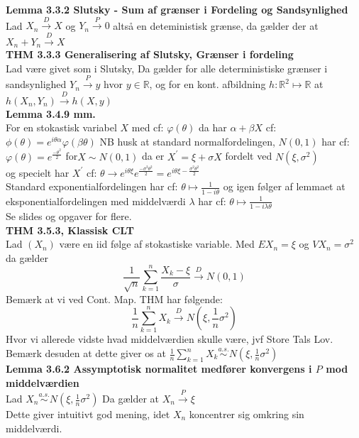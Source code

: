 \textbf{Lemma 3.3.2 Slutsky - Sum af grænser i Fordeling og Sandsynlighed}\\
Lad $X_n \xrightarrow{D} X$ og $Y_n \xrightarrow{P} 0$ altså en deteministisk grænse, da gælder der at $X_n + Y_n \xrightarrow{D} X$ \\
\textbf{THM 3.3.3 Generalisering af Slutsky, Grænser i fordeling}\\
Lad være givet som i Slutsky, Da gælder for alle deterministiske grænser i sandsynlighed $Y_n \xrightarrow{P} y$ hvor $y \in \mathbb{R}$, og for en kont. afbildning $h:\mathbb{R}^2 \mapsto \mathbb{R}$ at $h(X_n, Y_n) \xrightarrow{D} h(X,y)$\newline \\

\textbf{Lemma 3.4.9  mm.}\\
For en stokastisk variabel $X$ med cf: $\varphi(\theta)$ da har $\alpha + \beta X$ cf: $\phi (\theta )=e^{i\theta \alpha}  \varphi (\beta \theta )$\newline
NB husk at standard normalfordelingen, $N(0,1)$ har cf: $\varphi(\theta)= e^{\frac{-\theta^2}{2}}$
for\newline $X\sim N(0,1)$ da er $X^\prime = \xi + \sigma X$ fordelt ved $N(\xi , \sigma ^2)$\\ og specielt har $X^\prime$ cf:
$\theta \to e^{i\theta \xi} e^{\frac{-\sigma ^2 \theta ^2}{2}}=e^{i\theta \xi -\frac{\sigma ^2 \theta ^2}{2}}$ \\
Standard exponentialfordelingen har cf:  $\theta \mapsto \frac{1}{1-i\theta}$ og igen følger af lemmaet at eksponentialfordelingen med middelværdi $\lambda$ har cf: $\theta \mapsto \frac{1}{1-i\lambda \theta}$\\
Se slides og opgaver for flere.\newline
\\
\textbf{THM 3.5.3, Klassisk CLT}\\
Lad $(X_n)$ være en iid følge af stokastiske variable. Med $EX_n=\xi$ og $VX_n=\sigma ^2$ da gælder
$$\frac{1}{\sqrt{n}}\sum\limits_{k=1}^n\frac{X_k-\xi}{\sigma} \xrightarrow{D} N(0,1) $$
Bemærk at vi ved Cont. Map. THM har følgende: 
$$\frac{1}{n} \sum\limits_{k=1}^n X_k \xrightarrow{D} N\left(\xi, \frac{1}{n}\sigma ^2\right)$$
Hvor vi allerede vidste hvad middelværdien skulle være, jvf Store Tals Lov. Bemærk desuden at dette giver os at $\frac{1}{n}\sum\limits_{k=1}^nX_k \stackrel{a.s.}{\sim} N(\xi,\frac{1}{n}\sigma^2)$\newline \\
\textbf{Lemma 3.6.2 Assymptotisk normalitet medfører konvergens i $P$ mod middelværdien}\\
Lad $X_n \stackrel{a.s.}{\sim} N(\xi,\frac{1}{n}\sigma ^2)$ Da gælder at $X_n \xrightarrow{P} \xi$ \\
Dette giver intuitivt god mening, idet $X_n$ koncentrer sig omkring sin middelværdi. 
\newpage

